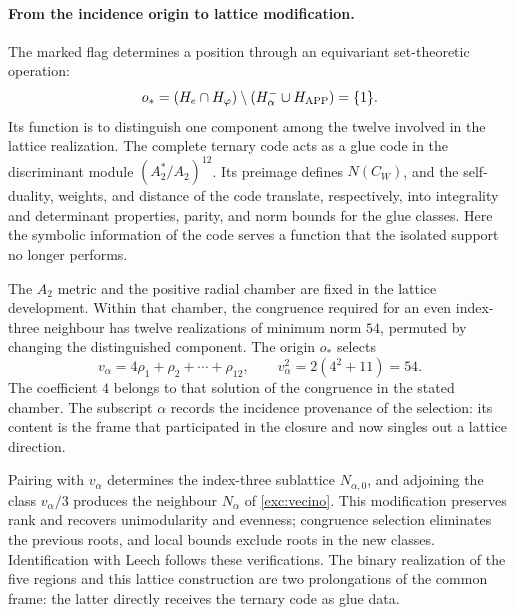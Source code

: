 \paragraph{From the incidence origin to lattice modification.}
\label{inc-ampl-reticulo}
The marked flag determines a position through an equivariant
set-theoretic operation:
\[
 o_*=(H_e\cap H_\varphi)
       \setminus(H^-_\alpha\cup H_{\rm APP})=\{1\}.
\]
Its function is to distinguish one component among the twelve
involved in the lattice realization. The complete ternary code
acts as a glue code in the discriminant module
$(A_2^*/A_2)^{12}$. Its preimage defines $N(C_W)$, and
the self-duality, weights, and distance of the code translate,
respectively, into integrality and determinant properties, parity,
and norm bounds for the glue classes. Here the symbolic information
of the code serves a function that the isolated support no longer performs.

The $A_2$ metric and the positive radial chamber are fixed in the
lattice development. Within that chamber, the congruence required for an
even index-three neighbour has twelve realizations of minimum norm $54$,
permuted by changing the distinguished component. The origin $o_*$
selects
\[
 v_\alpha=4\rho_1+\rho_2+\cdots+\rho_{12},\qquad
 v_\alpha^2=2(4^2+11)=54.
\]
The coefficient $4$ belongs to that solution of the congruence in the
stated chamber. The subscript $\alpha$ records the incidence
provenance of the selection: its content is the frame that participated in
the closure and now singles out a lattice direction.

Pairing with $v_\alpha$ determines the index-three sublattice
$N_{\alpha,0}$, and adjoining the class
$v_\alpha/3$ produces the neighbour $N_\alpha$ of
\eqref{exc:vecino}. This modification preserves rank and recovers
unimodularity and evenness; congruence selection eliminates the
previous roots, and local bounds exclude roots in the new classes.
Identification with Leech follows these verifications. The
binary realization of the five regions and this lattice construction
are two prolongations of the common frame: the latter directly receives
the ternary code as glue data.
